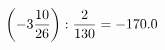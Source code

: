 \documentclass[preview]{standalone}
\begin{document}
\begin{align*}
\left( -3 { 10 \over 26 } \right)  :  { 2 \over 130 } = -170.0
\end{align*}
\end{document}
